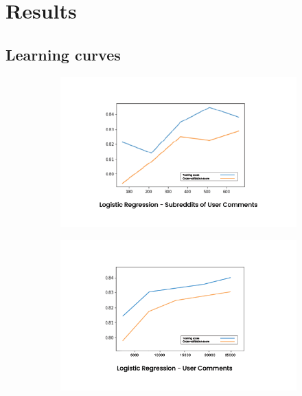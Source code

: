 \documentclass{article}
\begin{document}
\section{Results}
    
    \subsection{Learning curves}
    
   \begin{figure}[H]
        \begin{subfigure}[t]{.5\textwidth}
            \centering
            \includegraphics[width=\linewidth]{1}
        \end{subfigure}
        \hfill
        \begin{subfigure}[t]{.5\textwidth}
            \centering
            \includegraphics[width=\linewidth]{2}
        \end{subfigure}
    \end{figure}
\end{document}
